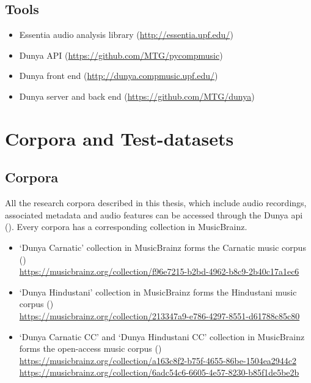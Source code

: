 \subsection*{Tools}

\begin{itemize}
	\item Essentia audio analysis library (\url{http://essentia.upf.edu/})
	\item Dunya API  (\url{https://github.com/MTG/pycompmusic})
	\item Dunya front end  (\url{http://dunya.compmusic.upf.edu/})
	\item Dunya server and back end  (\url{https://github.com/MTG/dunya})
\end{itemize}


\section*{Corpora and Test-datasets}

\subsection*{Corpora}

All the research corpora described in this thesis, which include audio recordings, associated metadata and audio features can be accessed through the Dunya \acrshort{api} (). Every corpora has a corresponding collection in MusicBrainz.

\begin{itemize}
	\item `Dunya Carnatic' collection in MusicBrainz forms the Carnatic music corpus () \\ \url{https://musicbrainz.org/collection/f96e7215-b2bd-4962-b8c9-2b40c17a1ec6}
	\item `Dunya Hindustani' collection in MusicBrainz forms the Hindustani music corpus () \\
	\url{https://musicbrainz.org/collection/213347a9-e786-4297-8551-d61788c85c80}
	\item `Dunya Carnatic CC' and `Dunya Hindustani CC' collection in MusicBrainz forms the open-access music corpus () \\
	\url{https://musicbrainz.org/collection/a163c8f2-b75f-4655-86be-1504ea2944c2}\\
	\url{https://musicbrainz.org/collection/6adc54c6-6605-4e57-8230-b85f1de5be2b}
\end{itemize}

